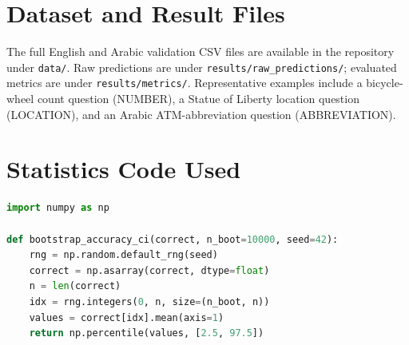 \documentclass[10pt,twocolumn]{article}
\begin{document}
\section{Dataset and Result Files}
The full English and Arabic validation CSV files are available in the repository under \texttt{data/}. Raw predictions are under \texttt{results/raw_predictions/}; evaluated metrics are under \texttt{results/metrics/}. Representative examples include a bicycle-wheel count question (NUMBER), a Statue of Liberty location question (LOCATION), and an Arabic ATM-abbreviation question (ABBREVIATION).
\section{Statistics Code Used}
\begin{lstlisting}[language=Python,caption={Bootstrap accuracy confidence interval code used.}]
import numpy as np

def bootstrap_accuracy_ci(correct, n_boot=10000, seed=42):
    rng = np.random.default_rng(seed)
    correct = np.asarray(correct, dtype=float)
    n = len(correct)
    idx = rng.integers(0, n, size=(n_boot, n))
    values = correct[idx].mean(axis=1)
    return np.percentile(values, [2.5, 97.5])
\end{lstlisting}
\end{document}
